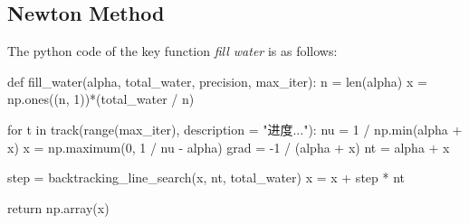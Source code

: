 \documentclass[12pt, a4paper, oneside]{article}
\begin{document}
\subsection{Newton Method}
The python code of the key function \textit{fill water} is as follows:
\begin{python}[h]
    def fill_water(alpha, total_water, precision, max_iter):
    n = len(alpha)
    x = np.ones((n, 1))*(total_water / n)
    
    for t in track(range(max_iter), description = "进度..."):
        nu = 1 / np.min(alpha + x)
        x = np.maximum(0, 1 / nu - alpha)
        grad = -1 / (alpha + x)
        nt = alpha + x
        
        step = backtracking_line_search(x, nt, total_water)
        x = x + step * nt

    return np.array(x)
\end{python}
\end{document}
